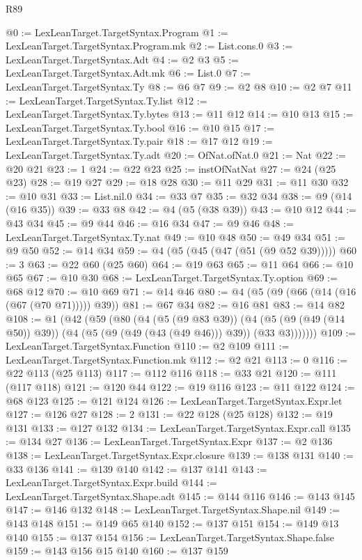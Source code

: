 \begin{lexlean}{R89}
\begin{coremodule}
@0 := LexLeanTarget.TargetSyntax.Program
@1 := LexLeanTarget.TargetSyntax.Program.mk
@2 := List.cons.{0}
@3 := LexLeanTarget.TargetSyntax.Adt
@4 := @2 @3
@5 := LexLeanTarget.TargetSyntax.Adt.mk
@6 := List.{0}
@7 := LexLeanTarget.TargetSyntax.Ty
@8 := @6 @7
@9 := @2 @8
@10 := @2 @7
@11 := LexLeanTarget.TargetSyntax.Ty.list
@12 := LexLeanTarget.TargetSyntax.Ty.bytes
@13 := @11 @12
@14 := @10 @13
@15 := LexLeanTarget.TargetSyntax.Ty.bool
@16 := @10 @15
@17 := LexLeanTarget.TargetSyntax.Ty.pair
@18 := @17 @12
@19 := LexLeanTarget.TargetSyntax.Ty.adt
@20 := OfNat.ofNat.{0}
@21 := Nat
@22 := @20 @21
@23 := 1
@24 := @22 @23
@25 := instOfNatNat
@27 := @24 (@25 @23)
@28 := @19 @27
@29 := @18 @28
@30 := @11 @29
@31 := @11 @30
@32 := @10 @31
@33 := List.nil.{0}
@34 := @33 @7
@35 := @32 @34
@38 := @9 (@14 (@16 @35))
@39 := @33 @8
@42 := @4 (@5 (@38 @39))
@43 := @10 @12
@44 := @43 @34
@45 := @9 @44
@46 := @16 @34
@47 := @9 @46
@48 := LexLeanTarget.TargetSyntax.Ty.nat
@49 := @10 @48
@50 := @49 @34
@51 := @9 @50
@52 := @14 @34
@59 := @4 (@5 (@45 (@47 (@51 (@9 @52 @39)))))
@60 := 3
@63 := @22 @60 (@25 @60)
@64 := @19 @63
@65 := @11 @64
@66 := @10 @65
@67 := @10 @30
@68 := LexLeanTarget.TargetSyntax.Ty.option
@69 := @68 @12
@70 := @10 @69
@71 := @14 @46
@80 := @4 (@5 (@9 (@66 (@14 (@16 (@67 (@70 @71))))) @39))
@81 := @67 @34
@82 := @16 @81
@83 := @14 @82
@108 := @1
    (@42
      (@59
        (@80
          (@4
            (@5 (@9 @83 @39))
            (@4 (@5 (@9 (@49 (@14 @50)) @39)) (@4 (@5 (@9 (@49 (@43 (@49 @46))) @39)) (@33 @3)))))))
@109 := LexLeanTarget.TargetSyntax.Function
@110 := @2 @109
@111 := LexLeanTarget.TargetSyntax.Function.mk
@112 := @2 @21
@113 := 0
@116 := @22 @113 (@25 @113)
@117 := @112 @116
@118 := @33 @21
@120 := @111 (@117 @118)
@121 := @120 @44
@122 := @19 @116
@123 := @11 @122
@124 := @68 @123
@125 := @121 @124
@126 := LexLeanTarget.TargetSyntax.Expr.let
@127 := @126 @27
@128 := 2
@131 := @22 @128 (@25 @128)
@132 := @19 @131
@133 := @127 @132
@134 := LexLeanTarget.TargetSyntax.Expr.call
@135 := @134 @27
@136 := LexLeanTarget.TargetSyntax.Expr
@137 := @2 @136
@138 := LexLeanTarget.TargetSyntax.Expr.closure
@139 := @138 @131
@140 := @33 @136
@141 := @139 @140
@142 := @137 @141
@143 := LexLeanTarget.TargetSyntax.Expr.build
@144 := LexLeanTarget.TargetSyntax.Shape.adt
@145 := @144 @116
@146 := @143 @145
@147 := @146 @132
@148 := LexLeanTarget.TargetSyntax.Shape.nil
@149 := @143 @148
@151 := @149 @65 @140
@152 := @137 @151
@154 := @149 @13 @140
@155 := @137 @154
@156 := LexLeanTarget.TargetSyntax.Shape.false
@159 := @143 @156 @15 @140
@160 := @137 @159

\end{coremodule}
\end{lexlean}
